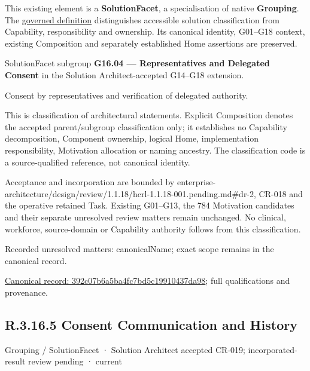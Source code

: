 This existing element is a \textbf{SolutionFacet}, a specialisation of native
\textbf{Grouping}. The \href{\detokenize{../../../../../../../governance/continuum-representation.md#solutionfacet-classification--1119-candidate}}{governed definition}
distinguishes accessible solution classification from Capability, responsibility
and ownership. Its canonical identity, G01–G18 context, existing Composition
and separately established Home assertions are preserved.



SolutionFacet subgroup \textbf{G16.04 — Representatives and Delegated Consent} in the Solution Architect-accepted G14–G18 extension.



Consent by representatives and verification of delegated authority.



This is classification of architectural statements. Explicit Composition denotes the accepted parent/subgroup classification only; it establishes no Capability decomposition, Component ownership, logical Home, implementation responsibility, Motivation allocation or naming ancestry. The classification code is a source-qualified reference, not canonical identity.



Acceptance and incorporation are bounded by enterprise-architecture/design/review/1.1.18/hcrl-1.1.18-001.pending.md\#dr-2, CR-018 and the operative retained Task. Existing G01–G13, the 784 Motivation candidates and their separate unresolved review matters remain unchanged. No clinical, workforce, source-domain or Capability authority follows from this classification.


{\small Recorded unresolved matters: canonicalName; exact scope remains in the canonical record.}\par
{\footnotesize \href{../../../../../../../continuum/grouping/392c07b6a5ba4fc7bd5c19910437da98.md}{Canonical record: 392c07b6a5ba4fc7bd5c19910437da98}; full qualifications and provenance.}\par
\subsection*{R.3.16.5 Consent Communication and History}
\label{navigation:R.3.16.5}

\label{element:52508b8b7aec4b1cbaa570576442d4c9}
{\small Grouping / SolutionFacet · Solution Architect accepted CR-019; incorporated-result review pending · current}\par

